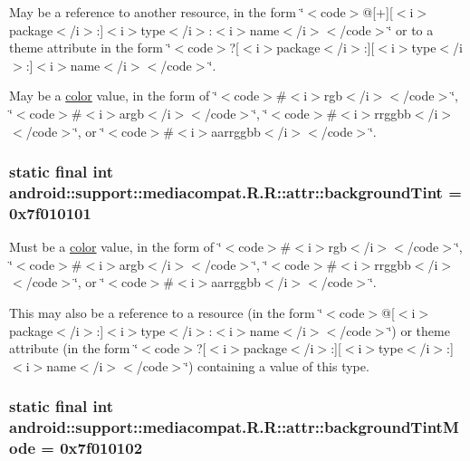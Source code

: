 May be a reference to another resource, in the form \char`\"{}$<$code$>$@\mbox{[}+\mbox{]}\mbox{[}$<$i$>$package$<$/i$>$:\mbox{]}$<$i$>$type$<$/i$>$:$<$i$>$name$<$/i$>$$<$/code$>$\char`\"{} or to a theme attribute in the form \char`\"{}$<$code$>$?\mbox{[}$<$i$>$package$<$/i$>$:\mbox{]}\mbox{[}$<$i$>$type$<$/i$>$:\mbox{]}$<$i$>$name$<$/i$>$$<$/code$>$\char`\"{}. 

May be a \hyperlink{classandroid_1_1support_1_1mediacompat_1_1_r_1_1color}{color} value, in the form of \char`\"{}$<$code$>$\#$<$i$>$rgb$<$/i$>$$<$/code$>$\char`\"{}, \char`\"{}$<$code$>$\#$<$i$>$argb$<$/i$>$$<$/code$>$\char`\"{}, \char`\"{}$<$code$>$\#$<$i$>$rrggbb$<$/i$>$$<$/code$>$\char`\"{}, or \char`\"{}$<$code$>$\#$<$i$>$aarrggbb$<$/i$>$$<$/code$>$\char`\"{}. \hypertarget{classandroid_1_1support_1_1mediacompat_1_1_r_1_1attr_f2a6ce7b51fa69e5303fd361bfe2fd35}{
\subsubsection[{backgroundTint}]{\setlength{\rightskip}{0pt plus 5cm}static final int android::support::mediacompat.R.R::attr::backgroundTint = 0x7f010101}}
\label{classandroid_1_1support_1_1mediacompat_1_1_r_1_1attr_f2a6ce7b51fa69e5303fd361bfe2fd35}


Must be a \hyperlink{classandroid_1_1support_1_1mediacompat_1_1_r_1_1color}{color} value, in the form of \char`\"{}$<$code$>$\#$<$i$>$rgb$<$/i$>$$<$/code$>$\char`\"{}, \char`\"{}$<$code$>$\#$<$i$>$argb$<$/i$>$$<$/code$>$\char`\"{}, \char`\"{}$<$code$>$\#$<$i$>$rrggbb$<$/i$>$$<$/code$>$\char`\"{}, or \char`\"{}$<$code$>$\#$<$i$>$aarrggbb$<$/i$>$$<$/code$>$\char`\"{}. 

This may also be a reference to a resource (in the form \char`\"{}$<$code$>$@\mbox{[}$<$i$>$package$<$/i$>$:\mbox{]}$<$i$>$type$<$/i$>$:$<$i$>$name$<$/i$>$$<$/code$>$\char`\"{}) or theme attribute (in the form \char`\"{}$<$code$>$?\mbox{[}$<$i$>$package$<$/i$>$:\mbox{]}\mbox{[}$<$i$>$type$<$/i$>$:\mbox{]}$<$i$>$name$<$/i$>$$<$/code$>$\char`\"{}) containing a value of this type. \hypertarget{classandroid_1_1support_1_1mediacompat_1_1_r_1_1attr_fad18882b39fffc8d65f3a5f0b0b6b86}{
\subsubsection[{backgroundTintMode}]{\setlength{\rightskip}{0pt plus 5cm}static final int android::support::mediacompat.R.R::attr::backgroundTintMode = 0x7f010102}}
\label{classandroid_1_1support_1_1mediacompat_1_1_r_1_1attr_fad18882b39fffc8d65f3a5f0b0b6b86}


